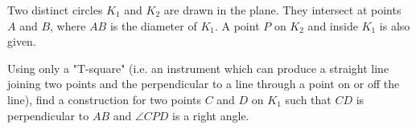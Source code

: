 Two distinct circles $K_1$ and $K_2$ are drawn in the plane. They intersect at points $A$ and $B$,  where $AB$ is the diameter of $K_1$. A point $P$ on $K_2$ and inside $K_1$ is also given.

Using only a "T-square" (i.e. an instrument which can produce a straight line joining two points and the perpendicular to a line through a point on or off the line), find a construction for two points $C$ and $D$ on $K_1$ such that $CD$ is perpendicular to $AB$ and $\angle CPD$ is a right angle.